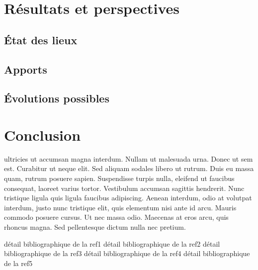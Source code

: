 \documentclass{EPUProjetDi}
\begin{document}
\chapter{Résultats et perspectives}

\section{État des lieux}
\section{Apports}

\section{Évolutions possibles}


\chapter*{Conclusion}
 ultricies ut accumsan magna interdum. Nullam ut malesuada urna. Donec ut sem est. Curabitur ut neque elit. Sed aliquam sodales libero ut rutrum. Duis eu massa quam, rutrum posuere sapien. Suspendisse turpis nulla, eleifend ut faucibus consequat, laoreet varius tortor. Vestibulum accumsan sagittis hendrerit. Nunc tristique ligula quis ligula faucibus adipiscing. Aenean interdum, odio at volutpat interdum, justo nunc tristique elit, quis elementum nisi ante id arcu. Mauris commodo posuere cursus. Ut nec massa odio. Maecenas at eros arcu, quis rhoncus magna. Sed pellentesque dictum nulla nec pretium.

\begin{thebibliography}{99}
\label{sec:biblio}
  détail bibliographique de la ref1
  détail bibliographique de la ref2
  détail bibliographique de la ref3
  détail bibliographique de la ref4
  détail bibliographique de la ref5
\end{thebibliography}


\appendix
{}
\end{document}
